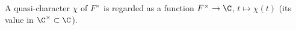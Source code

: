 A quasi-character $\chi$ of $F^\times$ is regarded as a function $F^\times\to\C$, $t\mapsto\chi(t)$ (its value in $\C^\times\subset\C$).
